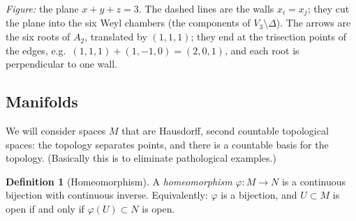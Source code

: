 \documentclass[11pt,openany]{book}
\theoremstyle{plain}
\theoremstyle{definition}
\newtheorem{definition}[theorem]{Definition}
\theoremstyle{remark}
\begin{document}
\begin{center}
\end{center}
\noindent\textit{Figure:} the plane $x+y+z=3$. The dashed lines are the walls
$x_i=x_j$; they cut the plane into the six Weyl chambers (the components of
$V_3\setminus\Delta$). The arrows are the six roots of $A_2$, translated by $(1,1,1)$; they
end at the trisection points of the edges, e.g.\ $(1,1,1)+(1,-1,0)=(2,0,1)$, and each
root is perpendicular to one wall.

\subsection{Manifolds}
\label{L07:subsec:manifolds}

We will consider spaces $M$ that are Hausdorff, second countable topological spaces: the
topology separates points, and there is a countable basis for the topology. (Basically
this is to eliminate pathological examples.)

\begin{definition}[Homeomorphism]
A \emph{homeomorphism} $\varphi\colon M\to N$ is a continuous bijection with continuous
inverse. Equivalently: $\varphi$ is a bijection, and $U\subset M$ is open if and only if
$\varphi(U)\subset N$ is open.
\end{definition}
\end{document}
